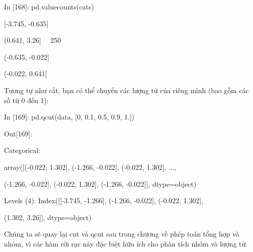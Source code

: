     \quad\textup{In [168]: pd.value\textunderscore counts(cats)  }\par
    \quad\textup{[-3.745, -0.635]    }\par
    \quad\textup{(0.641, 3.26]  \quad\ \       250   }\par
    \quad\textup{(-0.635, -0.022]   }\par
    \quad\textup{(-0.022, 0.641]    }\par
 Tương tự như cắt, bạn có thể chuyển các lượng tử của riêng mình (bao gồm các số từ 0 đến 1): \par
    \quad\textup{In [169]: pd.qcut(data, [0, 0.1, 0.5, 0.9, 1.])}\par
    \quad\textup{Out[169]:   }\par
    \quad\textup{Categorical:   }\par 
    \quad\textup{array([(-0.022, 1.302], (-1.266, -0.022], (-0.022, 1.302], ..., }\par
    \quad\textup{\quad\quad (-1.266, -0.022], (-0.022, 1.302], (-1.266, -0.022]], dtype=object)   }\par
    \quad\textup{Levels (4): Index([[-3.745, -1.266], (-1.266, -0.022], (-0.022, 1.302],}\par
    \quad\textup{\quad\quad\quad\quad (1.302, 3.26]], dtype=object) }\par
Chúng ta sẽ quay lại cut và qcut sau trong chương về phép toán tổng hợp và nhóm, 
vì các hàm rời rạc này đặc biệt hữu ích cho phân tích nhóm và lượng tử. \par
 
